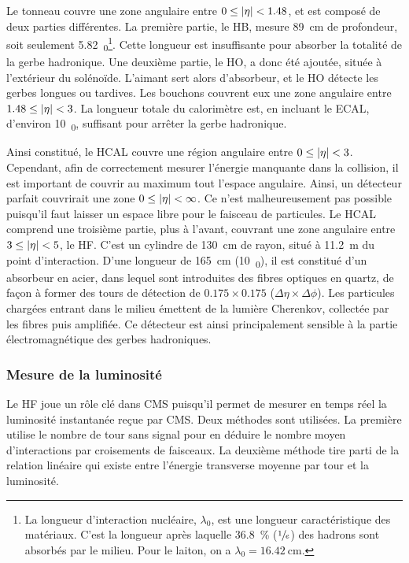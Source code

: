 Le tonneau couvre une zone angulaire entre $0 \leq \lvert \eta \rvert < \num{1.48}$, et est composé de deux parties différentes. La première partie, le HB, mesure \SI{89}{\cm} de profondeur, soit seulement \SI{5.82}{\lambda_0}\footnote{La longueur d'interaction nucléaire, $\lambda_0$, est une longueur caractéristique des matériaux. C'est la longueur après laquelle \SI{36.8}{\%} ($\sfrac{1}{e}$) des hadrons sont absorbés par le milieu. Pour le laiton, on a $\lambda_0 = \SI{16.42}{\cm}$.}. Cette longueur est insuffisante pour absorber la totalité de la gerbe hadronique. Une deuxième partie, le HO, a donc été ajoutée, située à l'extérieur du solénoïde. L'aimant sert alors d'absorbeur, et le HO détecte les gerbes longues ou tardives. Les bouchons couvrent eux une zone angulaire entre $1.48 \leq \lvert \eta \rvert < \num{3}$. La longueur totale du calorimètre est, en incluant le ECAL, d'environ \SI{10}{\lambda_0}, suffisant pour arrêter la gerbe hadronique.

\bigskip

Ainsi constitué, le HCAL couvre une région angulaire entre $0 \leq \lvert \eta \rvert < \num{3}$. Cependant, afin de correctement mesurer l'énergie manquante dans la collision, il est important de couvrir au maximum tout l'espace angulaire. Ainsi, un détecteur parfait couvrirait une zone $0 \leq \lvert \eta \rvert < \infty$. Ce n'est malheureusement pas possible puisqu'il faut laisser un espace libre pour le faisceau de particules. Le HCAL comprend une troisième partie, plus à l'avant, couvrant une zone angulaire entre $\num{3} \leq \lvert \eta \rvert < \num{5}$, le HF. C'est un cylindre de \SI{130}{\cm} de rayon, situé à \SI{11.2}{\m} du point d'interaction. D'une longueur de \SI{165}{\cm} (\tilde \SI{10}{\lambda_0}), il est constitué d'un absorbeur en acier, dans lequel sont introduites des fibres optiques en quartz, de façon à former des tours de détection de $\num{0.175} \times \num{0.175}$ ($\Delta\eta \times \Delta\phi$). Les particules chargées entrant dans le milieu émettent de la lumière Cherenkov, collectée par les fibres puis amplifiée. Ce détecteur est ainsi principalement sensible à la partie électromagnétique des gerbes hadroniques.

\subsubsection{Mesure de la luminosité}

Le HF joue un rôle clé dans CMS puisqu'il permet de mesurer en temps réel la luminosité instantanée reçue par CMS. Deux méthodes sont utilisées. La première utilise le nombre de tour sans signal pour en déduire le nombre moyen d'interactions par croisements de faisceaux. La deuxième méthode tire parti de la relation linéaire qui existe entre l'énergie transverse moyenne par tour et la luminosité.

